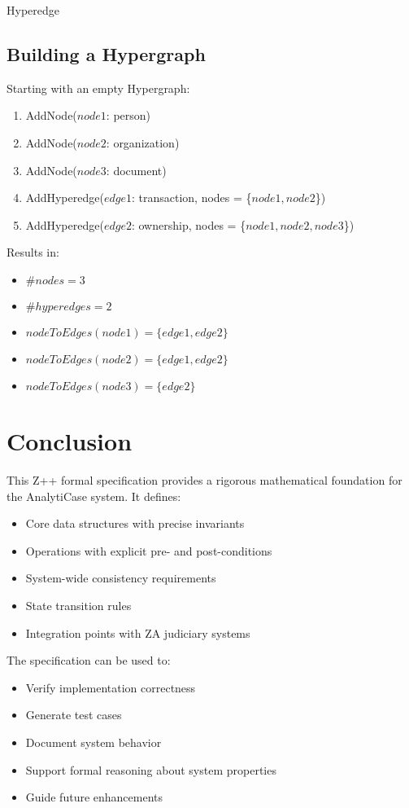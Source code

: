 \documentclass{article}
\begin{document}
\begin{class}{Hyperedge}
\subsection{Building a Hypergraph}

\begin{example}
Starting with an empty Hypergraph:
\begin{enumerate}
    \item AddNode($node1$: person)
    \item AddNode($node2$: organization)
    \item AddNode($node3$: document)
    \item AddHyperedge($edge1$: transaction, nodes = \{$node1, node2$\})
    \item AddHyperedge($edge2$: ownership, nodes = \{$node1, node2, node3$\})
\end{enumerate}

Results in:
\begin{itemize}
    \item $\#nodes = 3$
    \item $\#hyperedges = 2$
    \item $nodeToEdges(node1) = \{edge1, edge2\}$
    \item $nodeToEdges(node2) = \{edge1, edge2\}$
    \item $nodeToEdges(node3) = \{edge2\}$
\end{itemize}
\end{example}

\newpage

\section{Conclusion}

This Z++ formal specification provides a rigorous mathematical foundation for the 
AnalytiCase system. It defines:

\begin{itemize}
    \item Core data structures with precise invariants
    \item Operations with explicit pre- and post-conditions
    \item System-wide consistency requirements
    \item State transition rules
    \item Integration points with ZA judiciary systems
\end{itemize}

The specification can be used to:
\begin{itemize}
    \item Verify implementation correctness
    \item Generate test cases
    \item Document system behavior
    \item Support formal reasoning about system properties
    \item Guide future enhancements
\end{itemize}


\end{class}
\end{document}

